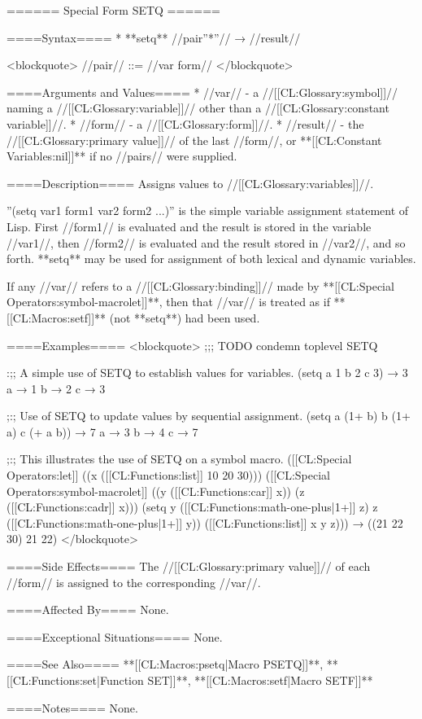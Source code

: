 ====== Special Form SETQ ======

====Syntax====
  * **setq** //{pair''*''}// → //result//
  
<blockquote>
//pair// ::= //var form//
</blockquote>

====Arguments and Values====
  * //var// - a //[[CL:Glossary:symbol]]// naming a //[[CL:Glossary:variable]]// other than a //[[CL:Glossary:constant variable]]//.
  * //form// - a //[[CL:Glossary:form]]//.
  * //result// - the //[[CL:Glossary:primary value]]// of the last //form//, or **[[CL:Constant Variables:nil]]** if no //pairs// were supplied.

====Description====
Assigns values to //[[CL:Glossary:variables]]//.

''(setq var1 form1 var2 form2 ...)'' is the simple variable assignment statement of Lisp. First //form1// is evaluated and the result is stored in the variable //var1//, then //form2// is evaluated and the result stored in //var2//, and so forth. **setq** may be used for assignment of both lexical and dynamic variables.

If any //var// refers to a //[[CL:Glossary:binding]]// made by **[[CL:Special Operators:symbol-macrolet]]**, then that //var// is treated as if **[[CL:Macros:setf]]** (not **setq**) had been used.

====Examples====
<blockquote>
;;; TODO condemn toplevel SETQ

:;; A simple use of SETQ to establish values for variables. 
(setq a 1 b 2 c 3) → 3
a → 1 
b → 2
c → 3

;:; Use of SETQ to update values by sequential assignment. 
(setq a (1+ b) b (1+ a) c (+ a b)) → 7 a → 3 b → 4 c → 7

;:; This illustrates the use of SETQ on a symbol macro. 
([[CL:Special Operators:let]] ((x ([[CL:Functions:list]] 10 20 30)))
  ([[CL:Special Operators:symbol-macrolet]] ((y ([[CL:Functions:car]] x)) (z ([[CL:Functions:cadr]] x))) 
    (setq y ([[CL:Functions:math-one-plus|1+]] z) z ([[CL:Functions:math-one-plus|1+]] y))
    ([[CL:Functions:list]] x y z))) → ((21 22 30) 21 22)
</blockquote>

====Side Effects====
The //[[CL:Glossary:primary value]]// of each //form// is assigned to the corresponding //var//.

====Affected By====
None.

====Exceptional Situations====
None.

====See Also====
**[[CL:Macros:psetq|Macro PSETQ]]**, **[[CL:Functions:set|Function SET]]**, **[[CL:Macros:setf|Macro SETF]]**

====Notes====
None.

